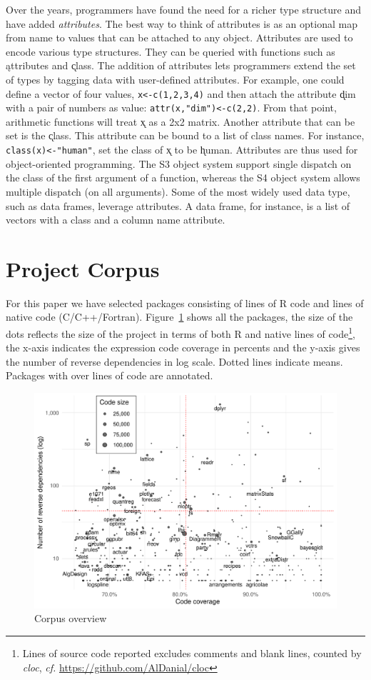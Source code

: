 \documentclass[acmsmall,review,anonymous]{acmart}\settopmatter{printfolios=true,printccs=false,printacmref=false}
\newcommand{\cf}{\emph{cf.}\xspace}
\newcommand{\code}[1]{{\lstinline[style=Rin]!#1!}\xspace}
\begin{document}
Over the years, programmers have found the need for a richer type structure
and have added {\it attributes}. The best way to think of attributes is as
an optional map from name to values that can be attached to any object.
Attributes are used to encode various type structures. They can be queried
with functions such as \k{attributes} and \k{class}.  The addition of
attributes lets programmers extend the set of types by tagging data with
user-defined attributes. For example, one could define a vector of four
values, \code{x<-c(1,2,3,4)} and then attach the attribute \k{dim} with a
pair of numbers as value: \code{attr(x,"dim")<-c(2,2)}.  From that point,
arithmetic functions will treat \k{x} as a 2x2 matrix. Another attribute
that can be set is the \k{class}.  This attribute can be bound to a list of
class names. For instance, \code{class(x)<-"human"}, set the class of \k{x}
to be \k{human}.  Attributes are thus used for object-oriented
programming. The S3 object system support single dispatch on the class of
the first argument of a function, whereas the S4 object system allows
multiple dispatch (on all arguments). Some of the most widely used data
type, such as data frames, leverage attributes. A data frame, for instance,
is a list of vectors with a class and a column name attribute.


%
%
\section{Project Corpus}\label{sec:corpus}

For this paper we have selected \CorpusLoadable packages consisting of
\CorpusRCodeRnd lines of R code and \CorpusNativeCodeRnd lines of native
code (C/C++/Fortran). Figure~\ref{fig:corpus} shows all the packages, the
size of the dots reflects the size of the project in terms of both R and
native lines of code\footnote{ Lines of source code reported excludes
  comments and blank lines, counted by \emph{cloc}, \cf
  \url{https://github.com/AlDanial/cloc}}, the x-axis indicates the
expression code coverage in percents and the y-axis gives the number of
reverse dependencies in log scale. Dotted lines indicate means.  Packages
with over \PackageSizeOutierRnd lines of code are annotated.

\begin{figure}[!h]  \centering
  \includegraphics[width=.8\linewidth]{plots/corpus.pdf}
  \caption{Corpus overview}\label{fig:corpus}
\end{figure}
\end{document}

